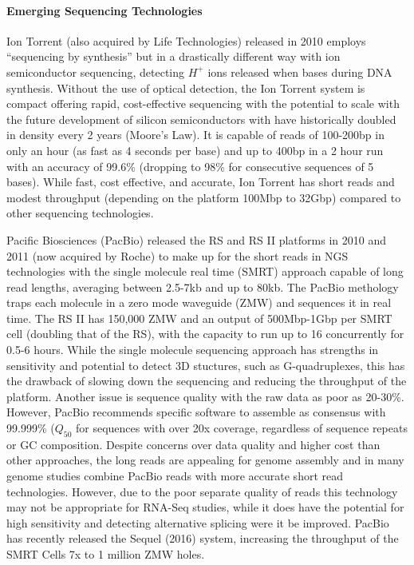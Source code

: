 \paragraph{Emerging Sequencing Technologies}

Ion Torrent (also acquired by Life Technologies) released in 2010 employs ``sequencing by synthesis'' but in a drastically different way with ion semiconductor sequencing, detecting $H^+$ ions released when bases during DNA synthesis. Without the use of optical detection, the Ion Torrent system is compact offering rapid, cost-effective sequencing with the potential to scale with the future development of silicon semiconductors with have historically doubled in density every 2 years (Moore's Law). It is capable of reads of 100-200bp in only an hour (as fast as 4 seconds per base) and up to 400bp in a 2 hour run with an accuracy of 99.6\% (dropping to 98\% for consecutive sequences of 5 bases). While fast, cost effective, and accurate, Ion Torrent has short reads and modest throughput (depending on the platform 100Mbp to 32Gbp) compared to other sequencing technologies.

Pacific Biosciences (PacBio) released the RS and RS II platforms in 2010 and 2011 (now acquired by Roche) to make up for the short reads in NGS technologies with the single molecule real time (SMRT) approach capable of long read lengths, averaging between 2.5-7kb and up to 80kb. The PacBio methology traps each molecule in a zero mode waveguide (ZMW) and sequences it in real time. The RS II has 150,000 ZMW and an output of 500Mbp-1Gbp per SMRT cell (doubling that of the RS), with the capacity to run up to 16 concurrently for 0.5-6 hours. While the single molecule sequencing approach has strengths in sensitivity and potential to detect 3D stuctures, such as G-quadruplexes, this has the drawback of slowing down the sequencing and reducing the throughput of the platform. Another issue is sequence quality with the raw data as poor as 20-30\%. However, PacBio recommends specific software to assemble as consensus with 99.999\% ($Q_{50}$ for sequences with over 20x coverage, regardless of sequence repeats or GC composition. Despite concerns over data quality and higher cost than other approaches, the long reads are appealing for genome assembly and in many genome studies combine PacBio reads with more accurate short read technologies. However, due to the poor separate quality of reads this technology may not be appropriate for RNA-Seq studies, while it does have the potential for high sensitivity and detecting alternative splicing were it be improved. PacBio has recently released the Sequel (2016) system, increasing the throughput of the SMRT Cells 7x to 1 million ZMW holes. 


